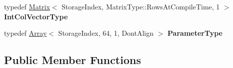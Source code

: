 \begin{DoxyCompactItemize}
\item 
\mbox{\label{class_eigen_1_1_pardiso_impl_a11e6b204912c77d1eceeb05f712b946b}} 
typedef \mbox{\hyperlink{class_eigen_1_1_matrix}{Matrix}}$<$ Storage\+Index, Matrix\+Type\+::\+Rows\+At\+Compile\+Time, 1 $>$ {\bfseries Int\+Col\+Vector\+Type}
\item 
\mbox{\label{class_eigen_1_1_pardiso_impl_a5b0f199e9396b2aaac3bf80d34ac10ec}} 
typedef \mbox{\hyperlink{class_eigen_1_1_array}{Array}}$<$ Storage\+Index, 64, 1, Dont\+Align $>$ {\bfseries Parameter\+Type}
\end{DoxyCompactItemize}
\subsection*{Public Member Functions}
